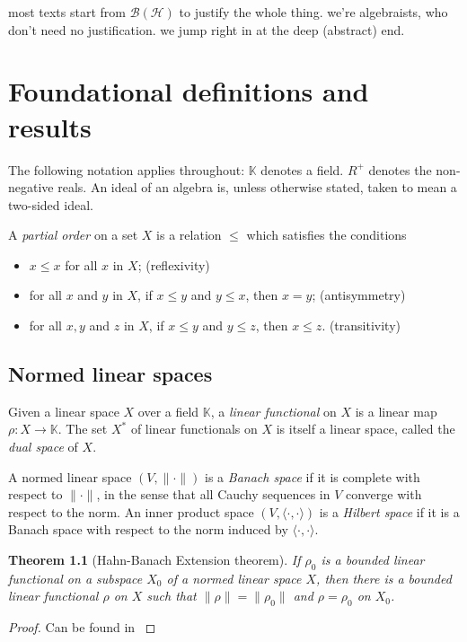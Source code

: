 \documentclass[12pt,a4paper]{report}
\theoremstyle{plain}
\newtheorem*{thm*}{Theorem}
\theoremstyle{definition}
\newcommand{\1}{\mathbbm{1}}
\renewcommand{\H}{\mathcal{H}}
\newcommand{\B}{\mathcal{B}}
\newcommand{\BH}{\mathcal{\B(\H)}}
\begin{document}
most texts start from $\BH$ to justify the whole thing. we're algebraists, who don't need no justification. we jump right in at the deep (abstract) end.


\chapter{Foundational definitions and results}


The following notation applies throughout:
$\mathbb{K}$ denotes a field. $R^+$ denotes the non-negative reals. An ideal of an algebra is, unless otherwise stated, taken to mean a two-sided ideal. 

A \emph{partial order} on a set $X$ is a relation $\leq$ which satisfies the conditions
\begin{itemize}
	\item $x \leq x$ for all $x$ in $X$; 		\hfill (reflexivity)
	\item for all $x$ and $y$ in $X$, if $x \leq y$ and $y\leq x$, then $x=y$; 
												\hfill (antisymmetry)
	\item for all $x,y$ and $z$ in $X$, if $x \leq y$ and $y\leq z$, then $x\leq z$. 
												\hfill (transitivity)
\end{itemize}

\section{Normed linear spaces}

Given a linear space $X$ over a field $\mathbb K$, a \emph{linear functional} on $X$ is a linear map 
$\rho:X\to\mathbb K$. The set $X^\ast$ of linear functionals on $X$ is itself a linear space, called
the \emph{dual space} of $X$.

A normed linear space $(V,\|\cdot\|)$ is a \emph{Banach space} if it is complete with respect to 
$\|\cdot\|$, in the sense that all Cauchy sequences in $V$ converge with respect to the norm. An inner 
product space $(V,\langle\cdot,\cdot\rangle)$ is a \emph{Hilbert space} if it is a Banach space with 
respect to the norm induced by $\langle\cdot,\cdot\rangle$.

\begin{thm*}[Hahn-Banach Extension theorem] 
	If $\rho_0$ is a bounded linear functional on a subspace $X_0$ of a normed linear space $X$,
	then there is a bounded linear functional $\rho$ on $X$ such that $\|\rho\|=\|\rho_0\|$ and 
	$\rho=\rho_0$ on $X_0$.
\end{thm*}
\begin{proof}
	Can be found in \cite[Theorem 1.6.1, p.~44]{kadison83}
\end{proof}
\end{document}
